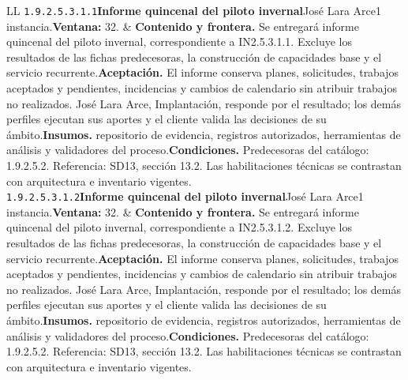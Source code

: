 \begin{longtable}{L{\tabcolsep\relax}L{\tabcolsep\relax}}
\texttt{1.\allowbreak{}9.\allowbreak{}2.\allowbreak{}5.\allowbreak{}3.\allowbreak{}1.\allowbreak{}1}\newline{}\textbf{Informe quincenal del piloto invernal}\newline{}José Lara Arce\newline{}1 instancia.\newline{}\textbf{Ventana:} 32. & \textbf{Contenido y frontera.} Se entregará informe quincenal del piloto invernal, correspondiente a IN2.5.3.1.1. Excluye los resultados de las fichas predecesoras, la construcción de capacidades base y el servicio recurrente.\newline{}\textbf{Aceptación.} El informe conserva planes, solicitudes, trabajos aceptados y pendientes, incidencias y cambios de calendario sin atribuir trabajos no realizados. José Lara Arce, Implantación, responde por el resultado; los demás perfiles ejecutan sus aportes y el cliente valida las decisiones de su ámbito.\newline{}\textbf{Insumos.} repositorio de evidencia, registros autorizados, herramientas de análisis y validadores del proceso.\newline{}\textbf{Condiciones.} Predecesoras del catálogo: 1.9.2.5.2. Referencia: SD13, sección 13.2. Las habilitaciones técnicas se contrastan con arquitectura e inventario vigentes.\\\hline
\texttt{1.\allowbreak{}9.\allowbreak{}2.\allowbreak{}5.\allowbreak{}3.\allowbreak{}1.\allowbreak{}2}\newline{}\textbf{Informe quincenal del piloto invernal}\newline{}José Lara Arce\newline{}1 instancia.\newline{}\textbf{Ventana:} 32. & \textbf{Contenido y frontera.} Se entregará informe quincenal del piloto invernal, correspondiente a IN2.5.3.1.2. Excluye los resultados de las fichas predecesoras, la construcción de capacidades base y el servicio recurrente.\newline{}\textbf{Aceptación.} El informe conserva planes, solicitudes, trabajos aceptados y pendientes, incidencias y cambios de calendario sin atribuir trabajos no realizados. José Lara Arce, Implantación, responde por el resultado; los demás perfiles ejecutan sus aportes y el cliente valida las decisiones de su ámbito.\newline{}\textbf{Insumos.} repositorio de evidencia, registros autorizados, herramientas de análisis y validadores del proceso.\newline{}\textbf{Condiciones.} Predecesoras del catálogo: 1.9.2.5.2. Referencia: SD13, sección 13.2. Las habilitaciones técnicas se contrastan con arquitectura e inventario vigentes.\\\hline

\end{longtable}
